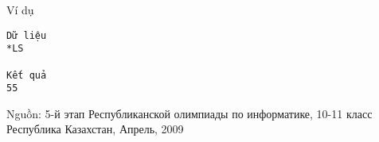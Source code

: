 Ví dụ  
\begin{verbatim}
Dữ liệu
*LS		

Kết quả
55
\end{verbatim}

   Nguồn: 5-й этап Республиканской олимпиады по информатике, 10-11 класс Республика Казахстан, Апрель, 2009